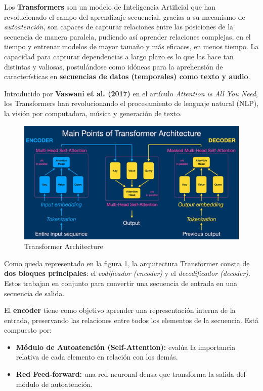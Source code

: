 Los \textbf{Transformers} son un modelo de Inteligencia Artificial que han revolucionado el campo del aprendizaje secuencial, gracias a su mecanismo de \textit{autoatención}, son capaces de capturar relaciones entre las posiciones de la secuencia de manera paralela, pudiendo así aprender relaciones complejas, en el tiempo y entrenar modelos de mayor tamaño y más eficaces, en menos tiempo. La capacidad para capturar dependencias a largo plazo es lo que las hace tan distintas y valiosas, postulándose como idóneas para la aprehensión de características en \textbf{secuencias de datos (temporales) como texto y audio}.

Introducido por \textbf{Vaswani et al. (2017)} en el artículo \textit{Attention is All You Need}, los Transformers han revolucionando el procesamiento de lenguaje natural (NLP), la visión por computadora, música y generación de texto.

\begin{figure}[H]
  \centering
  \includegraphics[width=1\textwidth]{images/transformer.png}
  \caption{Transformer Architecture}
  \label{fig:transformer}
\end{figure}

Como queda representado en la figura \ref{fig:transformer}, la arquitectura Transformer consta de \textbf{dos bloques principales}: el \textit{codificador (encoder)} y el \textit{decodificador (decoder)}. Estos trabajan en conjunto para convertir una secuencia de entrada en una secuencia de salida.

El \textbf{encoder} tiene como objetivo aprender una representación interna de la entrada, preservando las relaciones entre todos los elementos de la secuencia. Está compuesto por:
\begin{itemize}
    \item \textbf{Módulo de Autoatención (Self-Attention):} evalúa la importancia relativa de cada elemento en relación con los demás.
    \item \textbf{Red Feed-forward:} una red neuronal densa que transforma la salida del módulo de autoatención.
\end{itemize}


